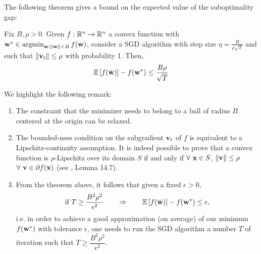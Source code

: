 \documentclass{article}
\begin{document}
 


The following theorem gives a bound on the expected value of the suboptimality gap:
\begin{thm}
Fix $B, \rho>0$. Given $f: \mathbb{R}^n \to \mathbb{R}^n$ a convex function with ${\bf w}^\ast \in \operatorname{argmin}_{{\bf w}: \|{\bf w}\|<B} f({\bf w})$, consider a SGD algorithm with step size $\eta = \frac{B}{\rho\sqrt{T}}$ and such that $\|{\bf v}_t\|\leq \rho$ with probability 1. Then, 
\begin{gather}
\mathbb{E} \left[f(\bar{\bf w}) \right] - f({\bf w}^\ast) \leq \dfrac{B\rho}{\sqrt{T}}
\end{gather}
\end{thm}


We highlight the following remark:
\begin{enumerate}
\item The constraint that the minimizer needs to belong to a ball of radius $B$ centered at the origin can be relaxed.
\item The bounded-ness condition on the subgradient ${\bf v}_t$ of $f$ is equivalent to a Lipschitz-continuity assumption. It is indeed possible to prove that a convex function is $\rho$-Lipschitz over its domain $S$ if and only if $\forall \ {\bf x} \in S$, $\|{\bf v}\| \leq \rho$ $\forall \ {\bf v} \in \partial f({\bf x})$ (see \cite{Shalev2014}, Lemma 14.7).
\item From the theorem above, it follows that given a fixed $\epsilon>0$, 
$$ \text{if  }  T \geq \dfrac{B^2\rho^2}{\epsilon^2} \qquad \Rightarrow \qquad \mathbb{E} \left[f(\bar{\bf w}) \right] - f({\bf w}^\ast) \leq \epsilon, $$
i.e. in order to achieve a good approximation (on average) of our minimum $f({\bf w}^\ast)$ with tolerance $\epsilon$, one needs to run the SGD algorithm a number $T$ of iteration such that $T \geq \dfrac{B^2\rho^2}{\epsilon^2}$.
\end{enumerate}
\end{document}
